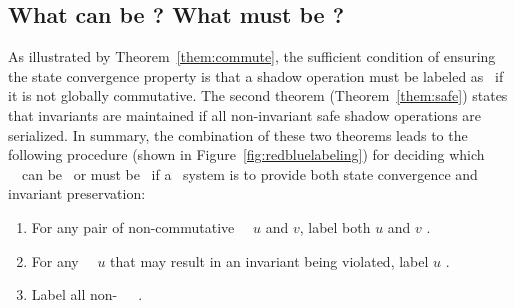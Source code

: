 \subsection{What can be \blue?  What must be \red?}  
\label{ch:redblue:sect:labelmethod}
As illustrated by Theorem~\ref{them:commute},
the sufficient condition of ensuring the state convergence property is
that a shadow operation must be labeled as \red\ if it is not
globally commutative. The second theorem (Theorem~\ref{them:safe}) states
that invariants are maintained if all non-invariant safe shadow
operations are serialized. In summary, the combination of these two theorems
leads to the following procedure (shown in Figure~\ref{fig:redbluelabeling}) for deciding which \shadow\ \operations\ can be
\blue\ or must be \red\ if a \RBct\ system is to provide both
state convergence and invariant preservation:
\begin{enumerate}%
\item For any pair of non-commutative \shadow\ \transactions\ $u$ and $v$, label both $u$ and $v$ \red.
\item For any \shadow\ \transaction\ $u$ that may result in an invariant being
  violated, label $u$ \red.
\item Label all non-\red\ \shadow\ \transactions\ \blue.
\end{enumerate}

